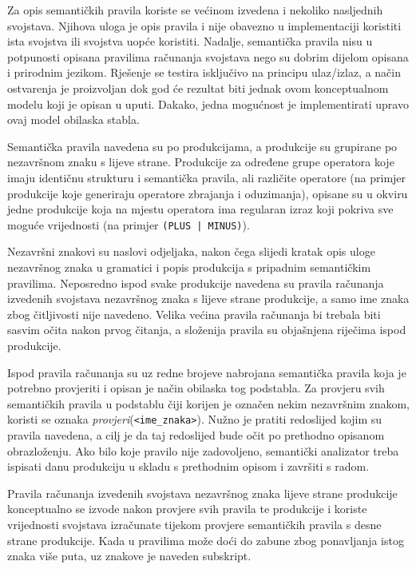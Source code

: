 \documentclass[times, 12pt, utf8]{book}
\begin{document}
Za opis semantičkih pravila koriste se većinom izvedena i nekoliko nasljednih svojstava.
Njihova uloga je opis pravila i nije obavezno u implementaciji koristiti ista svojstva ili svojstva uopće koristiti.
Nadalje, semantička pravila nisu u potpunosti opisana pravilima računanja svojstava nego su dobrim dijelom opisana i prirodnim jezikom.
Rješenje se testira isključivo na principu ulaz\slash{}izlaz, a način ostvarenja je proizvoljan dok god će rezultat biti jednak ovom konceptualnom modelu koji je opisan u uputi.
Dakako, jedna mogućnost je implementirati upravo ovaj model obilaska stabla.

Semantička pravila navedena su po produkcijama, a produkcije su grupirane po nezavršnom znaku s lijeve strane.
Produkcije za određene grupe operatora koje imaju identičnu strukturu i semantička pravila, ali različite operatore (na primjer produkcije koje generiraju operatore zbrajanja i oduzimanja), opisane su u okviru jedne produkcije koja na mjestu operatora ima regularan izraz koji pokriva sve moguće vrijednosti (na primjer \verb#(PLUS | MINUS)#).

Nezavršni znakovi su naslovi odjeljaka, nakon čega slijedi kratak opis uloge nezavršnog znaka u gramatici i popis produkcija s pripadnim semantičkim pravilima.
Neposredno ispod svake produkcije navedena su pravila računanja izvedenih svojstava nezavršnog znaka s lijeve strane produkcije, a samo ime znaka zbog čitljivosti nije navedeno.
Velika većina pravila računanja bi trebala biti sasvim očita nakon prvog čitanja, a složenija pravila su objašnjena riječima ispod produkcije.

Ispod pravila računanja su uz redne brojeve nabrojana semantička pravila koja je potrebno provjeriti i opisan je način obilaska tog podstabla.
Za provjeru svih semantičkih pravila u podstablu čiji korijen je označen nekim nezavršnim znakom, koristi se oznaka \emph{provjeri}(\verb|<ime_znaka>|).
Nužno je pratiti redoslijed kojim su pravila navedena, a cilj je da taj redoslijed bude očit po prethodno opisanom obrazloženju.
Ako bilo koje pravilo nije zadovoljeno, semantički analizator treba ispisati danu produkciju u skladu s prethodnim opisom i završiti s radom.

Pravila računanja izvedenih svojstava nezavršnog znaka lijeve strane produkcije konceptualno se izvode nakon provjere svih pravila te produkcije i koriste vrijednosti svojstava izračunate tijekom provjere semantičkih pravila s desne strane produkcije.
Kada u pravilima može doći do zabune zbog ponavljanja istog znaka više puta, uz znakove je naveden subskript.
\end{document}
